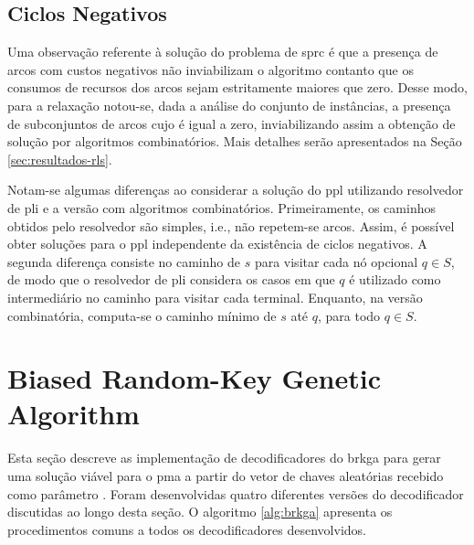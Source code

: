 \subsection{Ciclos Negativos} \label{subsec:rl-ciclo-negativo}

Uma observação referente à solução do problema de \gls{sprc} é que a presença de
arcos com custos negativos não inviabilizam o algoritmo contanto que os consumos
de recursos  dos arcos sejam estritamente  maiores que zero. Desse  modo, para a
relaxação {\rlq} notou-se, dada a análise  do conjunto de instâncias, a presença
de subconjuntos de  arcos cujo {\jitter} é igual a  zero, inviabilizando assim a
obtenção  de   solução  por   algoritmos  combinatórios.  Mais   detalhes  serão
apresentados na Seção \ref{sec:resultados-rls}.

Notam-se  algumas diferenças  ao considerar  a solução  do \gls{ppl}  utilizando
resolvedor de \gls{pli} e a  versão com algoritmos combinatórios. Primeiramente,
os caminhos  obtidos pelo  resolvedor são simples,  i.e., não  repetem-se arcos.
Assim, é possível obter soluções para  o \gls{ppl} independente da existência de
ciclos negativos.  A segunda diferença consiste  no caminho de $s$  para visitar
cada nó opcional $q  \in S$, de modo que o resolvedor  de \gls{pli} considera os
casos em  que $q$ é  utilizado como intermediário  no caminho para  visitar cada
terminal. Enquanto, na  versão combinatória, computa-se o caminho  mínimo de $s$
até $q$, para todo $q \in S$.

\section{Biased Random-Key Genetic Algorithm} \label{sec:brkga}


Esta  seção descreve  as implementação  de decodificadores  do \gls{brkga}  para
gerar uma solução viável para o \gls{pma} a partir do vetor de chaves aleatórias
recebido como parâmetro \cite{toso:2015}.  Foram desenvolvidas quatro diferentes
versões  do  decodificador   discutidas  ao  longo  desta   seção.  O  algoritmo
\ref{alg:brkga}  apresenta os  procedimentos comuns  a todos  os decodificadores
desenvolvidos.


